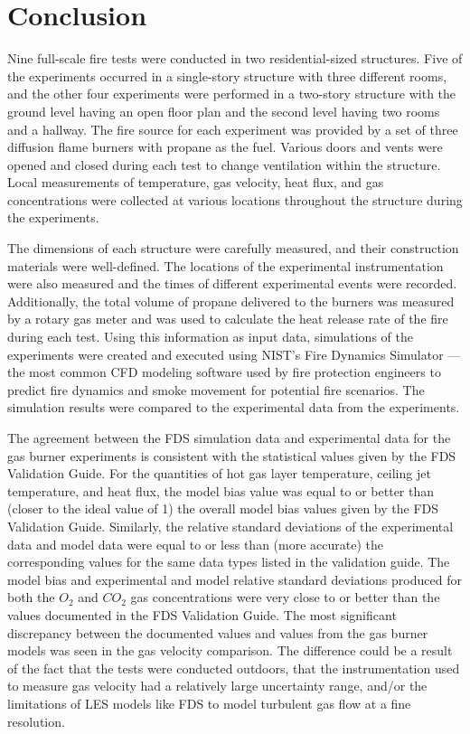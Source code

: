 
\renewcommand{\thechapter}{6}

\chapter{Conclusion}

Nine full-scale fire tests were conducted in two residential-sized structures. Five of the experiments occurred in a single-story structure with three different rooms, and the other four experiments were performed in a two-story structure with the ground level having an open floor plan and the second level having two rooms and a hallway. The fire source for each experiment was provided by a set of three diffusion flame burners with propane as the fuel. Various doors and vents were opened and closed during each test to change ventilation within the structure. Local measurements of temperature, gas velocity, heat flux, and gas concentrations were collected at various locations throughout the structure during the experiments. 

The dimensions of each structure were carefully measured, and their construction materials were well-defined. The locations of the experimental instrumentation were also measured and the times of different experimental events were recorded. Additionally, the total volume of propane delivered to the burners was measured by a rotary gas meter and was used to calculate the heat release rate of the fire during each test. Using this information as input data, simulations of the experiments were created and executed using NIST's Fire Dynamics Simulator --- the most common CFD modeling software used by fire protection engineers to predict fire dynamics and smoke movement for potential fire scenarios. The simulation results were compared to the experimental data from the experiments.

The agreement between the FDS simulation data and experimental data for the gas burner experiments is consistent with the statistical values given by the FDS Validation Guide. For the quantities of hot gas layer temperature, ceiling jet temperature, and heat flux, the model bias value was equal to or better than (closer to the ideal value of 1) the overall model bias values given by the FDS Validation Guide. Similarly, the relative standard deviations of the experimental data and model data were equal to or less than (more accurate) the corresponding values for the same data types listed in the validation guide. The model bias and experimental and model relative standard deviations produced for both the $O_2$ and $CO_2$ gas concentrations were very close to or better than the values documented in the FDS Validation Guide. The most significant discrepancy between the documented values and values from the gas burner models was seen in the gas velocity comparison. The difference could be a result of the fact that the tests were conducted outdoors, that the instrumentation used to measure gas velocity had a relatively large uncertainty range, and/or the limitations of LES models like FDS to model turbulent gas flow at a fine resolution.

